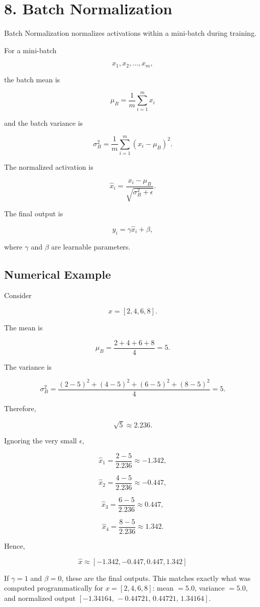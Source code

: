 \documentclass[10pt]{article}
\begin{document}
\section*{8. Batch Normalization}

Batch Normalization normalizes activations within a mini-batch during
training.

For a mini-batch

\[
x_1,x_2,\ldots,x_m,
\]

the batch mean is

\[
\mu_B=\frac{1}{m}\sum_{i=1}^{m}x_i
\]

and the batch variance is

\[
\sigma_B^2=
\frac{1}{m}\sum_{i=1}^{m}(x_i-\mu_B)^2.
\]

The normalized activation is

\[
\hat{x}_i=
\frac{x_i-\mu_B}
{\sqrt{\sigma_B^2+\epsilon}}.
\]

The final output is

\[
y_i=\gamma\hat{x}_i+\beta,
\]

where $\gamma$ and $\beta$ are learnable parameters.

\subsection*{Numerical Example}

Consider

\[
x=[2,4,6,8].
\]

The mean is

\[
\mu_B=\frac{2+4+6+8}{4}=5.
\]

The variance is

\[
\sigma_B^2=
\frac{(2-5)^2+(4-5)^2+(6-5)^2+(8-5)^2}{4}
=5.
\]

Therefore,

\[
\sqrt{5}\approx2.236.
\]

Ignoring the very small $\epsilon$,

\[
\hat{x}_1=\frac{2-5}{2.236}\approx-1.342,
\]

\[
\hat{x}_2=\frac{4-5}{2.236}\approx-0.447,
\]

\[
\hat{x}_3=\frac{6-5}{2.236}\approx0.447,
\]

\[
\hat{x}_4=\frac{8-5}{2.236}\approx1.342.
\]

Hence,

\[
\boxed{
\hat{x}\approx[-1.342,-0.447,0.447,1.342]
}
\]

If $\gamma=1$ and $\beta=0$, these are the final outputs. This matches
exactly what was computed programmatically for $x=[2,4,6,8]$: mean $=5.0$,
variance $=5.0$, and normalized output
$[-1.34164,\,-0.44721,\,0.44721,\,1.34164]$.
\end{document}
